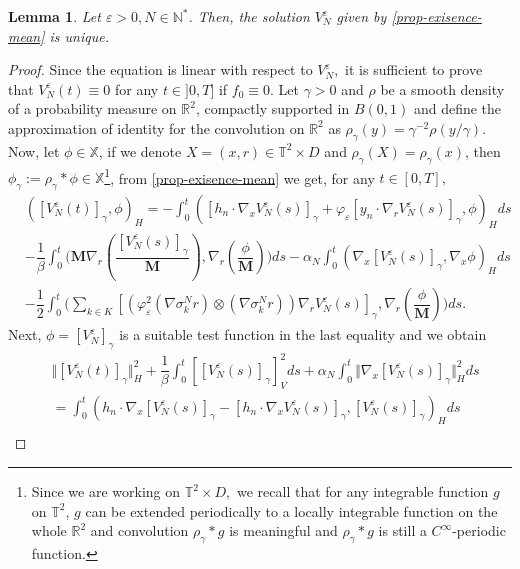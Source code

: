 \documentclass[a4paper,12pt, reqno]{amsart}
\newtheorem{lemma}[theorem]{Lemma}
\newcommand{\T}{\mathbb{T}}
\newcommand{\R}{\mathbb{R}}
\begin{document}
\begin{lemma}\label{lem-uniq-Vn}
		Let   $\varepsilon>0, N\in   \mathbb{N}^*$.   Then, the   solution  $V^\varepsilon_N$ given by \autoref{prop-exisence-mean}    is  unique.
\end{lemma}
\begin{proof}
       Since the equation is linear with respect to $V^\varepsilon_N,$ it is sufficient to prove that $V^\varepsilon_N(t)\equiv 0$ for any $t\in ]0,T]$ if $f_0\equiv 0$. Let $\gamma>0$    and      $\rho$ be   a smooth density of a probability measure on
$\R^2$, compactly supported in $B(0, 1)$    and define  the approximation of identity for the convolution on $\R^2$ as  $\rho_\gamma(y)=\gamma^{-2}\rho(y/\gamma).$ 
	 Now, let  $\phi\in \mathbb{X}$, if  we  denote  $X=(x,r)\in \T^2\times  D$   and $\rho_{\gamma}(X)=\rho_\gamma(x)$,
	then    $\phi_{\gamma}:=\rho_{\gamma}*\phi \in \mathbb{X}$\footnote{  Since   we  are working on  $\T^2\times D,$  we  recall  that    for any  integrable function $g$    on $\T^2$, $g$ can be extended
periodically to a locally integrable function on the whole $\R^2$   and
convolution $\rho_\gamma * g$ is    meaningful   and  $\rho_\gamma * g$ is still a $C^\infty$-periodic function. }, from 
    \autoref{prop-exisence-mean} we get,  for any $t\in[0,T],$    
			\begin{align*}
				&( [V^\varepsilon_N(t)]_\gamma,\phi)_H=-\int_0^t \left( [h_n\cdot \nabla_xV^\varepsilon_N(s)]_\gamma+\varphi_\varepsilon[y_n \cdot\nabla_rV^\varepsilon_N(s)]_\gamma,  \phi \right)_Hds \\
				&        -\dfrac{1}{\beta}\int_0^t\big(\mathbf{M}\nabla_r(\dfrac{[V^\varepsilon_N(s)]_\gamma}{\mathbf{M}}),\nabla_r\left(\dfrac{\phi}{\mathbf{M}}\right)\big) ds-\alpha_N\int_0^t( \nabla_x[V^\varepsilon_N(s)]_\gamma,\nabla_x \phi)_H ds\\& - \dfrac{1}{2}\int_0^t\big(\sum_{k\in K}[\left(\varphi_\varepsilon^2(\nabla \sigma_k^Nr) \otimes (\nabla \sigma_k^Nr)\right) \nabla_rV^\varepsilon_N(s)]_\gamma,\nabla_r\left(\dfrac{\phi}{\mathbf{M}}\right)\big) ds.
			\end{align*}
            Next, $\phi=[V^\varepsilon_N]_\gamma$ is a suitable test function in the last equality and we obtain
            \begin{align*}
			&\Vert[V^\varepsilon_N(t)]_\gamma\Vert^2_H+\dfrac{1}{\beta}\int_0^t[[V^\varepsilon_N(s)]_\gamma]^2_V ds+\alpha_N\int_0^t\Vert  \nabla_x[V^\varepsilon_N(s)]_\gamma\Vert_H^2 ds\\&=\int_0^t \left( h_n\cdot \nabla_x[V^\varepsilon_N(s)]_\gamma-[h_n\cdot \nabla_xV^\varepsilon_N(s)]_\gamma,  [V^\varepsilon_N(s)]_\gamma \right)_Hds \\

\end{align*}
\end{proof}
\end{document}
